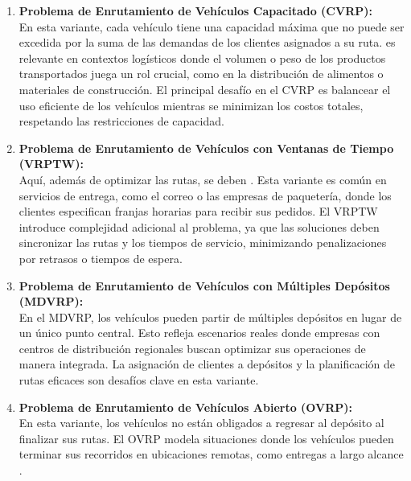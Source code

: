 \documentclass[12pt]{article}
\begin{document}
\begin{enumerate}
\item
\textbf{Problema de Enrutamiento de Vehículos Capacitado (CVRP):}\\
En esta variante, cada vehículo tiene una capacidad máxima que no puede ser excedida por la suma de las demandas de los clientes asignados a su ruta.   es relevante en contextos logísticos donde el volumen o peso de los productos transportados juega un rol crucial, como en la distribución de alimentos o materiales de construcción. El principal desafío en el CVRP es balancear el uso eficiente de los vehículos mientras se minimizan los costos totales, respetando las restricciones de capacidad.

\item
\textbf{Problema de Enrutamiento de Vehículos con Ventanas de Tiempo (VRPTW):}\\
Aquí, además de optimizar las rutas, se deben . Esta variante es común en servicios de entrega, como el correo o las empresas de paquetería, donde los clientes especifican franjas horarias para recibir sus pedidos. El VRPTW introduce complejidad adicional al problema, ya que las soluciones deben sincronizar las rutas y los tiempos de servicio, minimizando penalizaciones por retrasos o tiempos de espera.

\item
\textbf{Problema de Enrutamiento de Vehículos con Múltiples Depósitos (MDVRP):}\\
En el MDVRP, los vehículos pueden partir de múltiples depósitos en lugar de un único punto central. Esto refleja escenarios reales donde empresas con centros de distribución regionales buscan optimizar sus operaciones de manera integrada. La asignación de clientes a depósitos y la planificación de rutas eficaces son desafíos clave en esta variante.

\item
\textbf{Problema de Enrutamiento de Vehículos Abierto (OVRP):}\\
En esta variante, los vehículos no están obligados a regresar al depósito al finalizar sus rutas. El OVRP modela situaciones donde los vehículos pueden terminar sus recorridos en ubicaciones remotas, como entregas a largo alcance . 


\end{enumerate}
\end{document}

